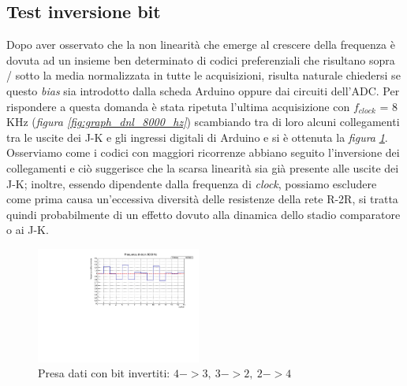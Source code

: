 \documentclass[journal]{IEEEtran}
\begin{document}
\subsection{Test inversione bit}
Dopo aver osservato che la non linearità che emerge al crescere della frequenza è dovuta ad un insieme ben determinato di codici preferenziali che risultano sopra / sotto la media normalizzata in tutte le acquisizioni, risulta naturale chiedersi se questo \textit{bias} sia introdotto dalla scheda Arduino oppure dai circuiti dell'ADC. Per rispondere a questa domanda è stata ripetuta l'ultima acquisizione con $f_{clock}$ = 8 KHz (\textit{figura \ref{fig:graph_dnl_8000_hz}}) scambiando tra di loro alcuni collegamenti tra le uscite dei J-K e gli ingressi digitali di Arduino e si è ottenuta la \textit{figura}  \textit{\ref{fig:graph_dnl_non_lin}}.
Osserviamo come i codici con maggiori ricorrenze abbiano seguito l'inversione dei collegamenti e ciò suggerisce che la scarsa linearità sia già presente alle uscite dei J-K; inoltre, essendo dipendente dalla frequenza di \textit{clock}, possiamo escludere come prima causa un'eccessiva diversità delle resistenze della rete R-2R, si tratta quindi probabilmente di un effetto dovuto alla dinamica dello stadio comparatore o ai J-K. 

\begin{figure}[H]%
\begin{center}
\includegraphics[width=0.48\textwidth]{analysis/output/dnl_non_lin_8000hz_bars.pdf}
\caption{Presa dati con bit invertiti: $ 4->3, \ 3->2, \ 2->4 $}  %
\label{fig:graph_dnl_non_lin}
\end{center}
\end{figure}



\end{document}

